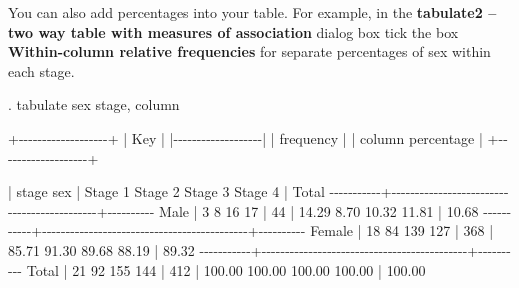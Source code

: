 \documentclass[
  a4paper,
]{memoir}
\newenvironment{Shaded}{\begin{snugshade}}{\end{snugshade}}
\newcommand{\DecValTok}[1]{\textcolor[rgb]{0.00,0.00,0.00}{#1}}
\newcommand{\ErrorTok}[1]{\textcolor[rgb]{0.00,0.00,0.00}{#1}}
\newcommand{\FloatTok}[1]{\textcolor[rgb]{0.00,0.00,0.00}{#1}}
\newcommand{\NormalTok}[1]{\textcolor[rgb]{0.00,0.00,0.00}{#1}}
\newcommand{\SpecialCharTok}[1]{\textcolor[rgb]{0.00,0.00,0.00}{#1}}
\begin{document}
You can also add percentages into your table. For example, in the
\textbf{tabulate2 -- two way table with measures of association} dialog
box tick the box \textbf{Within-column relative frequencies} for
separate percentages of sex within each stage.

\begin{Shaded}
\begin{Highlighting}[]
\NormalTok{. tabulate sex stage, column}

\SpecialCharTok{+{-}{-}{-}{-}{-}{-}{-}{-}{-}{-}{-}{-}{-}{-}{-}{-}{-}{-}{-}+}
\ErrorTok{|}\NormalTok{ Key               }\SpecialCharTok{|}
\ErrorTok{|}\SpecialCharTok{{-}{-}{-}{-}{-}{-}{-}{-}{-}{-}{-}{-}{-}{-}{-}{-}{-}{-}{-}}\ErrorTok{|}
\ErrorTok{|}\NormalTok{     frequency     }\SpecialCharTok{|}
\ErrorTok{|}\NormalTok{ column percentage }\SpecialCharTok{|}
\SpecialCharTok{+{-}{-}{-}{-}{-}{-}{-}{-}{-}{-}{-}{-}{-}{-}{-}{-}{-}{-}{-}+}

           \ErrorTok{|}\NormalTok{                    stage}
\NormalTok{       sex }\SpecialCharTok{|}\NormalTok{   Stage }\DecValTok{1}\NormalTok{    Stage }\DecValTok{2}\NormalTok{    Stage }\DecValTok{3}\NormalTok{    Stage }\DecValTok{4} \SpecialCharTok{|}\NormalTok{     Total}
\SpecialCharTok{{-}{-}{-}{-}{-}{-}{-}{-}{-}{-}{-}+{-}{-}{-}{-}{-}{-}{-}{-}{-}{-}{-}{-}{-}{-}{-}{-}{-}{-}{-}{-}{-}{-}{-}{-}{-}{-}{-}{-}{-}{-}{-}{-}{-}{-}{-}{-}{-}{-}{-}{-}{-}{-}{-}{-}+{-}{-}{-}{-}{-}{-}{-}{-}{-}{-}}
\NormalTok{      Male }\SpecialCharTok{|}         \DecValTok{3}          \DecValTok{8}         \DecValTok{16}         \DecValTok{17} \SpecialCharTok{|}        \DecValTok{44} 
           \SpecialCharTok{|}     \FloatTok{14.29}       \FloatTok{8.70}      \FloatTok{10.32}      \FloatTok{11.81} \SpecialCharTok{|}     \FloatTok{10.68} 
\SpecialCharTok{{-}{-}{-}{-}{-}{-}{-}{-}{-}{-}{-}+{-}{-}{-}{-}{-}{-}{-}{-}{-}{-}{-}{-}{-}{-}{-}{-}{-}{-}{-}{-}{-}{-}{-}{-}{-}{-}{-}{-}{-}{-}{-}{-}{-}{-}{-}{-}{-}{-}{-}{-}{-}{-}{-}{-}+{-}{-}{-}{-}{-}{-}{-}{-}{-}{-}}
\NormalTok{    Female }\SpecialCharTok{|}        \DecValTok{18}         \DecValTok{84}        \DecValTok{139}        \DecValTok{127} \SpecialCharTok{|}       \DecValTok{368} 
           \SpecialCharTok{|}     \FloatTok{85.71}      \FloatTok{91.30}      \FloatTok{89.68}      \FloatTok{88.19} \SpecialCharTok{|}     \FloatTok{89.32} 
\SpecialCharTok{{-}{-}{-}{-}{-}{-}{-}{-}{-}{-}{-}+{-}{-}{-}{-}{-}{-}{-}{-}{-}{-}{-}{-}{-}{-}{-}{-}{-}{-}{-}{-}{-}{-}{-}{-}{-}{-}{-}{-}{-}{-}{-}{-}{-}{-}{-}{-}{-}{-}{-}{-}{-}{-}{-}{-}+{-}{-}{-}{-}{-}{-}{-}{-}{-}{-}}
\NormalTok{     Total }\SpecialCharTok{|}        \DecValTok{21}         \DecValTok{92}        \DecValTok{155}        \DecValTok{144} \SpecialCharTok{|}       \DecValTok{412} 
           \SpecialCharTok{|}    \FloatTok{100.00}     \FloatTok{100.00}     \FloatTok{100.00}     \FloatTok{100.00} \SpecialCharTok{|}    \FloatTok{100.00} 
\end{Highlighting}
\end{Shaded}
\end{document}
